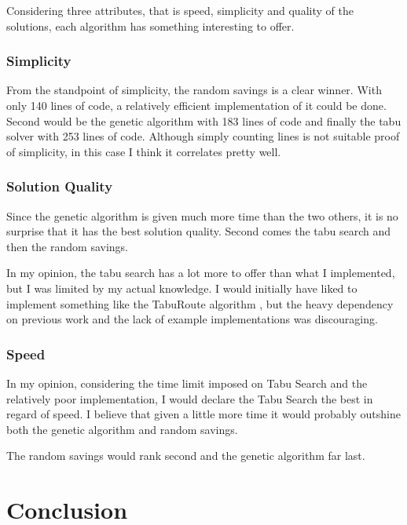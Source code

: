 \documentclass{article} %
\begin{document}
Considering three attributes, that is speed, simplicity and quality of the solutions, each algorithm has something interesting to offer.\newline


\subsubsection{Simplicity}

From the standpoint of simplicity, the random savings is a clear winner. With only 140 lines of code, a relatively efficient implementation of it could be done. Second would be the genetic algorithm with 183 lines of code and finally the tabu solver with 253 lines of code. Although simply counting lines is not suitable proof of simplicity, in this case I think it correlates pretty well.\newline


\subsubsection{Solution Quality}

Since the genetic algorithm is given much more time than the two others, it is no surprise that it has the best solution quality. Second comes the tabu search and then the random savings.\newline

In my opinion, the tabu search has a lot more to offer than what I implemented, but I was limited by my actual knowledge. I would initially have liked to implement something like the TabuRoute algorithm \citep{taburoute}, but the heavy dependency on previous work and the lack of example implementations was discouraging.\newline


\subsubsection{Speed}

In my opinion, considering the time limit imposed on Tabu Search and the relatively poor implementation, I would declare the Tabu Search the best in regard of speed. I believe that given a little more time it would probably outshine both the genetic algorithm and random savings.\newline

The random savings would rank second and the genetic algorithm far last.


\section{Conclusion}
\end{document}
